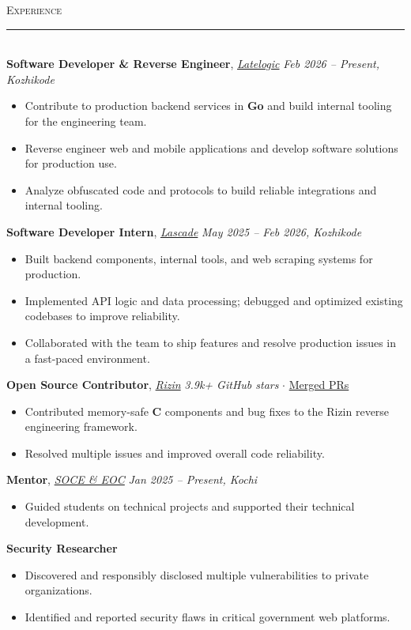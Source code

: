 \documentclass[a4paper,11pt]{article}
\newcommand{\header}[1]{\vfill{\large\textsc{#1}}\\[-8pt]\rule{\linewidth}{0.4pt}\\[2pt]}
\begin{document}
\header{Experience}
\textbf{Software Developer \& Reverse Engineer}, \textit{\href{https://latelogic.com/}{Latelogic}} \hfill \textit{Feb 2026 -- Present, Kozhikode}
\begin{itemize}
    \item Contribute to production backend services in \textbf{Go} and build internal tooling for the engineering team.
    \item Reverse engineer web and mobile applications and develop software solutions for production use.
    \item Analyze obfuscated code and protocols to build reliable integrations and internal tooling.
\end{itemize}
\vspace{3pt}
\textbf{Software Developer Intern}, \textit{\href{https://lascade.com/}{Lascade}} \hfill \textit{May 2025 -- Feb 2026, Kozhikode}
\begin{itemize}
    \item Built backend components, internal tools, and web scraping systems for production.
    \item Implemented API logic and data processing; debugged and optimized existing codebases to improve reliability.
    \item Collaborated with the team to ship features and resolve production issues in a fast-paced environment.
\end{itemize}
\vspace{3pt}
\textbf{Open Source Contributor}, \textit{\href{https://rizin.re/}{Rizin}} \hfill \textit{3.9k+ GitHub stars} $\cdot$ \href{https://github.com/rizinorg/rizin/pulls?q=is:pr+author:answarck+is:merged}{Merged PRs}
\begin{itemize}
    \item Contributed memory-safe \textbf{C} components and bug fixes to the Rizin reverse engineering framework.
    \item Resolved multiple issues and improved overall code reliability.
\end{itemize}
\vspace{3pt}
\textbf{Mentor}, \textit{\href{https://eocsoce.cusat.ac.in/}{SOCE \& EOC}} \hfill \textit{Jan 2025 -- Present, Kochi}
\begin{itemize}
    \item Guided students on technical projects and supported their technical development.
\end{itemize}
\vspace{3pt}
\textbf{Security Researcher}
\begin{itemize}
    \item Discovered and responsibly disclosed multiple vulnerabilities to private organizations.
    \item Identified and reported security flaws in critical government web platforms.
\end{itemize}
\end{document}
